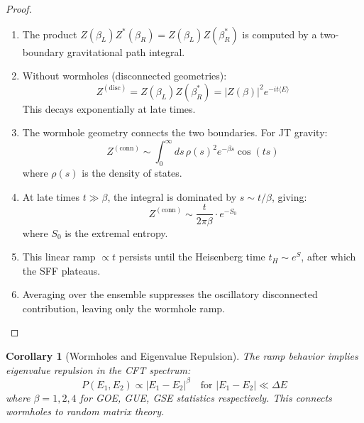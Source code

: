 \documentclass[12pt,a4paper]{article}
\newtheorem{corollary}[theorem]{Corollary}
\begin{document}
\begin{proof}
\begin{enumerate}
    \item The product $Z(\beta_L) Z^*(\beta_R) = Z(\beta_L) Z(\beta_R^*)$ is computed by a two-boundary gravitational path integral.
    
    \item Without wormholes (disconnected geometries):
    \begin{equation}
    Z^{(\text{disc})} = Z(\beta_L) Z(\beta_R^*) = |Z(\beta)|^2 e^{-i t \langle E \rangle}
    \end{equation}
    This decays exponentially at late times.
    
    \item The wormhole geometry connects the two boundaries. For JT gravity:
    \begin{equation}
    Z^{(\text{conn})} \sim \int_0^\infty ds \, \rho(s)^2 e^{-\beta s} \cos(ts)
    \end{equation}
    where $\rho(s)$ is the density of states.
    
    \item At late times $t \gg \beta$, the integral is dominated by $s \sim t/\beta$, giving:
    \begin{equation}
    Z^{(\text{conn})} \sim \frac{t}{2\pi \beta} \cdot e^{-S_0}
    \end{equation}
    where $S_0$ is the extremal entropy.
    
    \item This linear ramp $\propto t$ persists until the Heisenberg time $t_H \sim e^{S}$, after which the SFF plateaus.
    
    \item Averaging over the ensemble suppresses the oscillatory disconnected contribution, leaving only the wormhole ramp.
\end{enumerate}
\end{proof}

\begin{corollary}[Wormholes and Eigenvalue Repulsion]
The ramp behavior implies eigenvalue repulsion in the CFT spectrum:
\begin{equation}
P(E_1, E_2) \propto |E_1 - E_2|^\beta \quad \text{for } |E_1 - E_2| \ll \Delta E
\end{equation}
where $\beta = 1, 2, 4$ for GOE, GUE, GSE statistics respectively. This connects wormholes to random matrix theory.
\end{corollary}
\end{document}

